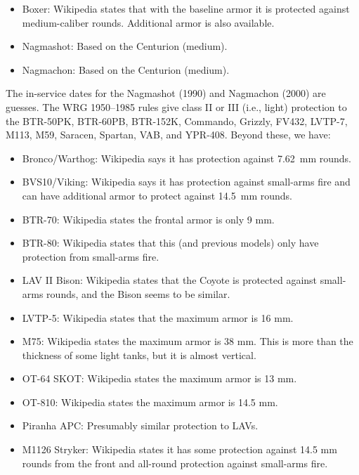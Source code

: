 {{        
        \begin{itemize}
            \item Boxer: Wikipedia states that with the baseline armor it is protected against medium-caliber rounds. Additional armor is also available.
            \item Nagmashot: Based on the Centurion (medium).
            \item Nagmachon: Based on the Centurion (medium).
        \end{itemize}
        The in-service dates for the Nagmashot (1990) and Nagmachon (2000) are guesses.
        The WRG 1950--1985 rules give class II or III (i.e., light) protection to the
        BTR-50PK,
        BTR-60PB,
        BTR-152K,
        Commando,
        Grizzly,
        FV432,
        LVTP-7,
        M113,
        M59,
        Saracen,
        Spartan,
        VAB, and
        YPR-408.
        Beyond these, we have:
        \begin{itemize}
            \item Bronco/Warthog: Wikipedia says it has protection against 7.62~mm rounds.
            \item BVS10/Viking: Wikipedia says it has protection against small-arms fire and can have additional armor to protect against 14.5~mm rounds.
            \item BTR-70: Wikipedia states the frontal armor is only 9 mm.
            \item BTR-80: Wikipedia states that this (and previous models) only have protection from small-arms fire.
            \item LAV II Bison: Wikipedia states that the Coyote is protected against small-arms rounds, and the Bison seems to be similar.
            \item LVTP-5: Wikipedia states that the maximum armor is 16 mm.
            \item M75: Wikipedia states the maximum armor is 38 mm. This is more than the thickness of some light tanks, but it is almost vertical.
            \item OT-64 SKOT: Wikipedia states the maximum armor is 13 mm.
            \item OT-810: Wikipedia states the maximum armor is 14.5 mm.
            \item Piranha APC: Presumably similar protection to LAVs.
            \item M1126 Stryker: Wikipedia states it has some protection against 14.5 mm rounds from the front and all-round protection against small-arms fire.

\end{itemize}}}
